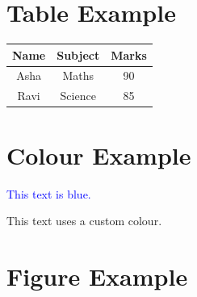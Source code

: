 \documentclass{article}
\begin{document}
\section{Table Example}
\begin{center}
\begin{tabular}{|c|c|c|}
\hline
Name & Subject & Marks \\
\hline
Asha & Maths & 90 \\
Ravi & Science & 85 \\
\hline
\end{tabular}
\end{center}

\section{Colour Example}
\textcolor{blue}{This text is blue.}

\textcolor{myblue}{This text uses a custom colour.}

\section{Figure Example}
\end{document}
